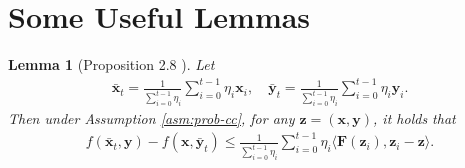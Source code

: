 \documentclass{article}
\def\vx{{\bm{x}}}
\def\vy{{\bm{y}}}
\def\vz{{\bm{z}}}
\def\mF{{\bm{F}}}
\theoremstyle{plain}
\newtheorem{lem}{Lemma}[section]
\begin{document}



\appendix

\section{Some Useful Lemmas}

\begin{lem}[Proposition 2.8 \citet{lin2022explicit}] \label{lem:avg}
Let
    \begin{align*}
        \bar \vx_t = \frac{1}{\sum_{i=0}^{t-1} \eta_i} \sum_{i=0}^{t-1} \eta_i \vx_i, \quad \bar \vy_t =  \frac{1}{\sum_{i=0}^{t-1} \eta_i} \sum_{i=0}^{t-1} \eta_i \vy_i.
    \end{align*}
Then under Assumption \ref{asm:prob-cc}, for any $\vz = (\vx,\vy)$, it holds that
\begin{align*}
    f(\bar \vx_t, \vy) - f(\vx , \bar \vy_t) \le \frac{1}{\sum_{i=0}^{t-1} \eta_i}  \sum_{i=0}^{t-1} \eta_i \langle \mF(\vz_i), \vz_i - \vz   \rangle. 
\end{align*}
\end{lem}
\end{document}
